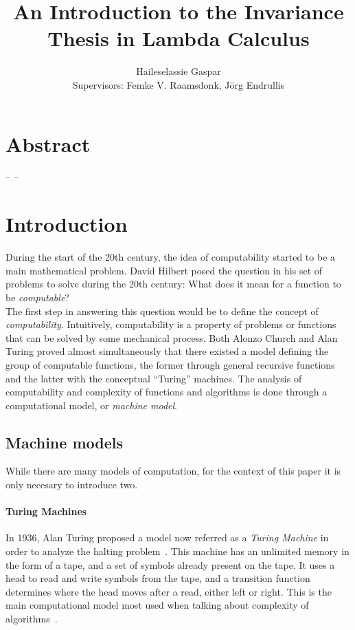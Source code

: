 \documentclass[12pt]{article}
\title{An Introduction to the Invariance Thesis in Lambda Calculus}
\author{Haileselassie Gaspar\\[1cm]{\small Supervisors: Femke V. Raamsdonk, Jörg Endrullis}}
\begin{document}
\maketitle

\section{Abstract}\label{abstract}
-- --
\section{Introduction}
During the start of the 20th century, the idea of computability started to be a main mathematical problem. David Hilbert posed the question in his set of problems to solve during the 20th century: What does it mean for a function to be \textit{computable}? \\
The first step in answering this question would be to define the concept of \textit{computability}. Intuitively, computability is a property of problems or functions that can be solved by some mechanical process. Both Alonzo Church and Alan Turing proved almost simultaneously that there existed a model defining the group of computable functions, the former through general recursive functions and the latter with the conceptual \enquote{Turing} machines.
The analysis of computability and complexity of functions and algorithms is done through a computational model, or \textit{machine model}.
\subsection{Machine models}
While there are many models of computation, for the context of this paper it is only necesary to introduce two.

\paragraph{Turing Machines}
In 1936, Alan Turing proposed a model now referred as a \textit{Turing Machine} in order to analyze the halting problem~\cite{on-computable-numbers}. This machine has an unlimited memory in the form of a tape, and a set of symbols already present on the tape. It uses a head to read and write symbols from the tape, and a transition function determines where the head moves after a read, either left or right. This is the main computational model most used when talking about complexity of algorithms~\cite{computation-theory}.
\end{document}
